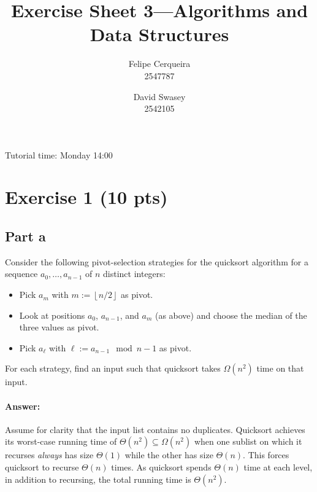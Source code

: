 \documentclass[a4paper]{article}
\title{Exercise Sheet 3---Algorithms and Data Structures}
\author{Felipe Cerqueira \\ 2547787 \and David Swasey \\ 2542105}
\newcommand*{\floor}[1]{\left\lfloor{#1}\right\rfloor}
\begin{document}
\maketitle

Tutorial time: Monday 14:00

\section{Exercise 1 (10 pts)}

\subsection{Part a}
Consider the following pivot-selection strategies for the quicksort algorithm for a sequence $a_0, \ldots, a_{n-1}$ of $n$ distinct integers:
\begin{itemize}
	\item Pick $a_m$ with $m := \floor{n/2}$ as pivot.
	\item Look at positions $a_0$, $a_{n-1}$, and $a_m$ (as above) and choose the median of the three values as pivot.
	\item Pick $a_\ell$ with $\ell := a_{n-1} \mod n-1$ as pivot.
\end{itemize}
For each strategy, find an input such that quicksort takes $\Omega(n^2)$ time on that input.

\paragraph{Answer:}%
\newcommand*{\USED}[1]{{\color{blue}#1}}%
\newcommand*{\argmedian}{\operatorname{argmedian}}%
\newcommand*{\set}[1]{\{#1\}}%
Assume for clarity that the input list contains no duplicates.
Quicksort achieves its worst-case running time of $\Theta(n^2) \subseteq \Omega(n^2)$ when one sublist on which it recurses \emph{always} has size $\Theta(1)$ while the other has size $\Theta(n)$.
This forces quicksort to recurse $\Theta(n)$ times.
As quicksort spends $\Theta(n)$ time at each level, in addition to recursing, the total running time is $\Theta(n^2)$.
\end{document}
